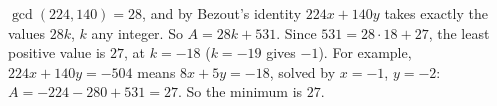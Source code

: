 $\gcd(224,140)=28$, and by Bezout's identity $224x+140y$ takes exactly the values $28k$, $k$ any integer. So $A=28k+531$. Since $531=28\cdot18+27$, the least positive value is $27$, at $k=-18$ ($k=-19$ gives $-1$). For example, $224x+140y=-504$ means $8x+5y=-18$, solved by $x=-1$, $y=-2$: $A=-224-280+531=27$. So the minimum is $\boxed{27}$.
